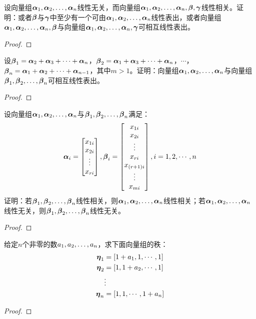 \begin{problem}\label{problem-2.32}
设向量组\(\enums{\vecal}{n}\)线性无关，而向量组\(\enums{\vecal}{n},\vecbeta,\vecgamma\)线性相关。证明：或者\(\vecbeta\)与\(\vecgamma\)中至少有一个可由\(\enums{\vecal}{n}\)线性表出，或者向量组\(\enums{\vecal}{n},\vecbeta\)与向量组\(\enums{\vecal}{n},\vecgamma\)可相互线性表出。
\end{problem}
\begin{proof}
\end{proof}

\begin{problem}\label{problem-2.33}
设\(\vecbeta_1=\vecal_2+\vecal_3+\cdots+\vecal_{n}\)，\(\vecbeta_2=\vecal_1+\vecal_3+\cdots+\vecal_{n}\)，\(\cdots\)，\(\vecbeta_n=\vecal_1+\vecal_2+\cdots+\vecal_{n-1}\)，其中\(m>1\)。证明：向量组\(\enums{\vecal}{n}\)与向量组\(\enums{\vecbeta}{n}\)可相互线性表出。
\end{problem}
\begin{proof}
\end{proof}

\begin{problem}\label{problem-2.34}
设向量组\(\enums{\vecal}{n}\)与\(\enums{\vecbeta}{n}\)满足：
\begin{equation*}
    \vecal_i=\begin{bmatrix}x_{1i}\\x_{2i}\\\vdots\\x_{ri}\end{bmatrix},
    \vecbeta_i=\begin{bmatrix}x_{1i}\\x_{2i}\\\vdots\\x_{ri}\\x_{\spar{r+1}i}\\\vdots\\x_{mi}\end{bmatrix},
    i=1,2,\cdots,n
\end{equation*}
证明：若\(\enums{\vecbeta}{n}\)线性相关，则\(\enums{\vecal}{n}\)线性相关；若\(\enums{\vecal}{n}\)线性无关，则\(\enums{\vecbeta}{n}\)线性无关。
\end{problem}
\begin{proof}
\end{proof}

\begin{problem}\label{problem-2.35}
给定\(n\)个非零的数\(\enums{a}{n}\)，求下面向量组的秩：
\begin{align*}
    \veceta_1 & =\mat{1+a_1,1,\cdots,1} \\
    \veceta_2 & =\mat{1,1+a_2,\cdots,1} \\
              & \vdots                  \\
    \veceta_n & =\mat{1,1,\cdots,1+a_n}
\end{align*}
\end{problem}
\begin{proof}
\end{proof}

